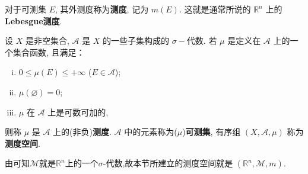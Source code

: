 \documentclass[../../main.tex]{subfiles}%
\begin{document}
\begin{definition}[Lebesgue测度]
对于可测集 \(E\), 其外测度称为\textbf{测度}, 记为 \(m(E)\). 这就是通常所说的 \(\mathbb{R}^n\) 上的 \textbf{Lebesgue测度}.
\end{definition}

\begin{definition}[测度]
设 \(X\) 是非空集合, \(\mathscr{A}\) 是 \(X\) 的一些子集构成的 \(\sigma -\)代数. 若 \(\mu\) 是定义在 \(\mathscr{A}\) 上的一个集合函数, 且满足：
\begin{enumerate}[(i)]
\item \(0 \leqslant  \mu(E) \leqslant  +\infty\) (\(E \in \mathscr{A}\));
\item \(\mu(\varnothing)=0\);
\item \(\mu\) 在 \(\mathscr{A}\) 上是可数可加的,
\end{enumerate}
则称 \(\mu\) 是 \(\mathscr{A}\) 上的(非负)\textbf{测度}. \(\mathscr{A}\) 中的元素称为(\(\mu\))\textbf{可测集}, 有序组 \((X, \mathscr{A}, \mu)\) 称为\textbf{测度空间}. 
\end{definition}
\begin{remark}
由可知$\mathscr{M}$就是$\mathbb{R}^n$上的一个$\sigma$-代数,故本节所建立的测度空间就是 \((\mathbb{R}^n, \mathscr{M}, m)\). 
\end{remark}
\end{document}
